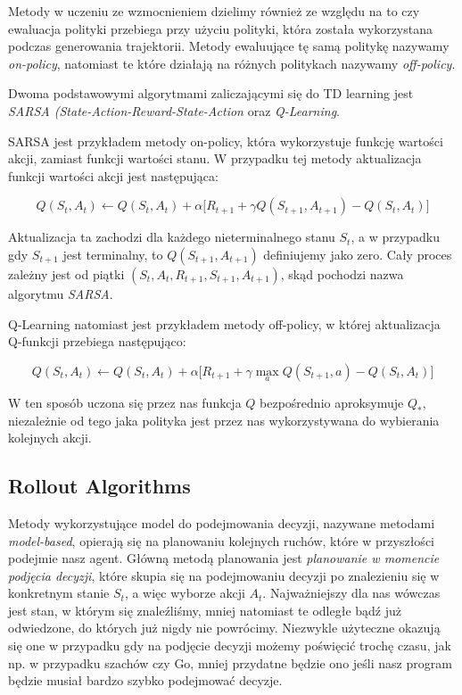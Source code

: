 \documentclass[licencjacka]{pracamgr}
\begin{document}
Metody w uczeniu ze wzmocnieniem dzielimy również ze względu na to czy ewaluacja polityki przebiega przy użyciu polityki, która została wykorzystana podczas generowania trajektorii. Metody ewaluujące tę samą politykę nazywamy \emph{on-policy}, natomiast te które działają na różnych politykach nazywamy \emph{off-policy}.

Dwoma podstawowymi algorytmami zaliczającymi się do TD learning jest \emph{SARSA (State-Action-Reward-State-Action} oraz \emph{Q-Learning}.

SARSA jest przykładem metody on-policy, która wykorzystuje funkcję wartości akcji, zamiast funkcji wartości stanu. W przypadku tej metody aktualizacja funkcji wartości akcji jest następująca:

$$ Q(S_t, A_t) \leftarrow Q(S_t, A_t) + \alpha \big[R_{t+1} + \gamma Q(S_{t+1}, A_{t+1}) - Q(S_t, A_t) \big] $$

Aktualizacja ta zachodzi dla każdego nieterminalnego stanu $S_t$, a w przypadku gdy $S_{t+1}$ jest terminalny, to $ Q(S_{t+1}, A_{t+1}) $ definiujemy jako zero. Cały proces zależny jest od piątki $ (S_t, A_t, R_{t+1}, S_{t+1}, A_{t+1}) $, skąd pochodzi nazwa algorytmu \emph{SARSA}.

Q-Learning natomiast jest przykładem metody off-policy, w której aktualizacja Q-funkcji przebiega następująco:

$$ Q(S_t, A_t) \leftarrow Q(S_t, A_t) + \alpha \big[R_{t+1} + \gamma \max_a Q(S_{t+1}, a) - Q(S_t, A_t) \big] $$

W ten sposób uczona się przez nas funkcja $Q$ bezpośrednio aproksymuje $Q_\ast$, niezależnie od tego jaka polityka jest przez nas wykorzystywana do wybierania kolejnych akcji.

\subsection{Rollout Algorithms}

Metody wykorzystujące model do podejmowania decyzji, nazywane metodami \emph{model-based}, opierają się na planowaniu kolejnych ruchów, które w przyszłości podejmie nasz agent. Główną metodą planowania jest \emph{planowanie w momencie podjęcia decyzji}, które skupia się na podejmowaniu decyzji po znalezieniu się w konkretnym stanie $S_t$, a więc wyborze akcji $A_t$. Najważniejszy dla nas wówczas jest stan, w którym się znaleźliśmy, mniej natomiast te odległe bądź już odwiedzone, do których już nigdy nie powrócimy. Niezwykle użyteczne okazują się one w przypadku gdy na podjęcie decyzji możemy poświęcić trochę czasu, jak np. w przypadku szachów czy Go, mniej przydatne będzie ono jeśli nasz program będzie musiał bardzo szybko podejmować decyzje. 
\end{document}
